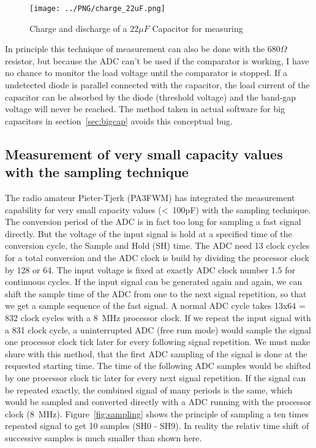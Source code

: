 \begin{figure}[H]
  \centering
    \texttt{[image: ../PNG/charge\_22uF.png]}
  \caption{Charge and discharge of a \(22\mu F\) Capacitor for measuring}
  \label{pic:c22uF}
\end{figure}


In principle this technique of measurement can also be done with the \(680\Omega\) resistor, but 
because the ADC can't be used if the comparator is working, I have no chance to monitor the
load voltage until the comparator is stopped. If a undetected diode is parallel connected with
the capacitor, the load current of the capacitor can be absorbed by the diode (threshold voltage) and
the band-gap voltage will never be reached.
The method taken in actual software for big capacitors in section~\ref{sec:bigcap}
avoids this conceptual bug.

\subsection{Measurement of very small capacity values with the sampling technique}
The radio amateur Pieter-Tjerk (PA3FWM) has integrated the measurement capability for very small
capacity values (\textless~100pF) with the sampling technique.
The conversion period of the ADC is in fact too long for sampling a fast signal directly.
But the voltage of the input signal is hold at a specified time of the conversion cycle,
the Sample and Hold (SH) time.
The ADC need 13 clock cycles for a total conversion and the ADC clock is build by dividing the
processor clock by 128 or 64.
The input voltage is fixed at exactly ADC clock number 1.5 for continuous cycles.
If the input signal can be generated again and again, we can shift the sample time of the ADC from
one to the next signal repetition, so that we get a sample sequence of the fast signal.
A normal ADC cycle takes 13x64 = 832 clock cycles with a 8~MHz processor clock.
If we repeat the input signal with a 831 clock cycle, a uninterrupted ADC (free rum mode) would
sample the signal one processor clock tick later for every following signal repetition.
We must make shure with this method, that the first ADC sampling of the signal is done at
the requested starting time. The time of the following ADC samples would be shifted by one processor clock
tic later for every next signal repetition.
If the signal can be repeated exactly, the combined signal of many periods is the same, 
which would be sampled and converted directly with a ADC running with the processor clock (8~MHz).
Figure~\ref{fig:sampling} shows the principle of sampling a ten times repeated signal
to get 10 samples (SH0 - SH9).
In reality the relativ time shift of successive samples is much smaller than shown here.

